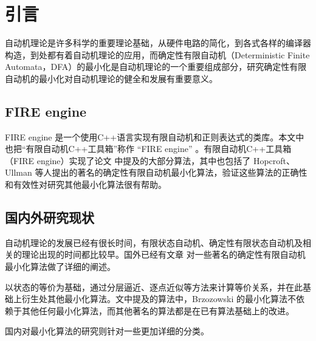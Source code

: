 \chapter{引言}
自动机理论是许多科学的重要理论基础，从硬件电路的简化，到各式各样的编译器构造，到处都有着自动机理论的应用，而确定性有限自动机（Deterministic Finite Automata，DFA）的最小化是自动机理论的一个重要组成部分，研究确定性有限自动机的最小化对自动机理论的健全和发展有重要意义。

\section{FIRE engine}
FIRE engine \cite{watson1994design}是一个使用C++语言实现有限自动机和正则表达式的类库。本文中也把“有限自动机C++工具箱”称作 “FIRE engine” 。有限自动机C++工具箱（FIRE engine）实现了论文 \cite{watson1993taxonomya,watson1993taxonomyb} 中提及的大部分算法，其中也包括了 Hopcroft、Ullman 等人提出的著名的确定性有限自动机最小化算法，验证这些算法的正确性和有效性对研究其他最小化算法很有帮助。

\section{国内外研究现状}

自动机理论的发展已经有很长时间，有限状态自动机、确定性有限状态自动机及相关的理论出现的时间都比较早。国外已经有文章 \cite{watson1993taxonomyb} 对一些著名的确定性有限自动机最小化算法做了详细的阐述。

以状态的等价为基础，通过分层逼近、逐点近似等方法来计算等价关系，并在此基础上衍生处其他最小化算法。文中提及的算法中，Brzozowski 的最小化算法不依赖于其他任何最小化算法，而其他著名的算法都是在已有算法基础上的改进\cite{watson1993taxonomyb}。

国内对最小化算法的研究则针对一些更加详细的分类。